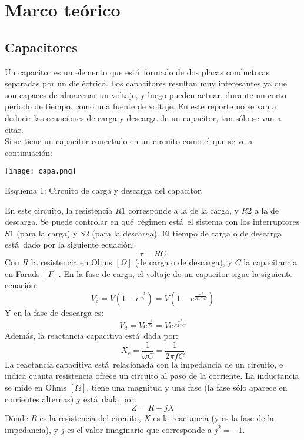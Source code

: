 \documentclass[11pt]{article}
\renewcommand{\=}[1]{\stackrel{#1}{=}} %
\theoremstyle{definition}
\theoremstyle{remark}
\begin{document}
\section{Marco te\'orico}
\subsection{Capacitores}
Un capacitor es un elemento que est\'a\ formado de dos placas conductoras separadas por un diel\'ectrico. Los capacitores resultan muy interesantes ya que son capaces de almacenar un voltaje, y luego pueden actuar, durante un corto periodo de tiempo, como una fuente de voltaje. En este reporte no se van a deducir las ecuaciones de carga y descarga de un capacitor, tan s\'olo se van a citar. \\
Si se tiene un capacitor conectado en un circuito como el que se ve a continuaci\'on:
\begin{center}
\texttt{[image: capa.png]}
\end{center}
\begin{center}
Esquema 1: Circuito de carga y descarga del capacitor.
\end{center}
En este circuito, la resistencia $R1$ corresponde a la de la carga, y $R2$ a la de descarga. Se puede controlar en qu\'e\ r\'egimen est\'a\ el sistema con los interruptores $S1$ (para la carga) y $S2$ (para la descarga). El tiempo de carga o de descarga est\'a\ dado por la siguiente ecuaci\'on:
\begin{equation}
\tau=RC
\end{equation}
Con $R$ la resistencia en Ohms $[\Omega]$ (de carga o de descarga), y $C$ la capacitancia en Farads $[F]$.
En la fase de carga, el voltaje de un capacitor sigue la siguiente ecuaci\'on:
\begin{equation}
V_c=V(1-e^{\frac{-t}{\tau_c}})=V(1-e^{\frac{-t}{R1*C}})
\end{equation}
Y en la fase de descarga es:
\begin{equation}
V_d=Ve^{\frac{-t}{\tau_d}}=Ve^{\frac{-t}{R2*C}}
\end{equation}
Adem\'as, la reactancia capacitiva est\'a\ dada por:
\begin{equation}
X_c=\frac{1}{\omega C}=\frac{1}{2\pi fC}
\end{equation}
La reactancia capacitiva est\'a\ relacionada con la impedancia de un circuito, e indica cuanta resistencia ofrece un circuito al paso de la corriente. La inductancia se mide en Ohms $[\Omega]$, tiene una magnitud y una fase (la fase s\'olo aparece en corrientes alternas) y est\'a\ dada por:
\begin{equation}
Z=R+jX
\end{equation}
D\'onde $R$ es la resistencia del circuito, $X$ es la reactancia (y es la fase de la impedancia), y $j$ es el valor imaginario que corresponde a $j^2=-1$.
\end{document}
